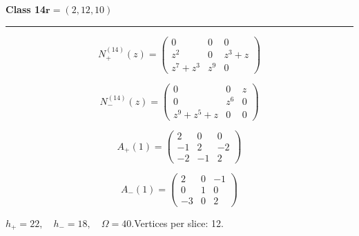 \noindent\begin{minipage}{\linewidth}
\noindent\textbf{Class 14}\hfill $\symbf{r}=(2,12,10)$
\par\smallskip\noindent\textcolor{rulegray}{\rule{\linewidth}{0.3pt}}
\begin{minipage}[c]{0.495\linewidth}\centering\fontsize{10.5}{13}\selectfont
\setlength{\abovedisplayskip}{3pt}\setlength{\belowdisplayskip}{3pt}
\setlength{\abovedisplayshortskip}{3pt}\setlength{\belowdisplayshortskip}{3pt}
\setlength{\arraycolsep}{3.5pt}\renewcommand{\arraystretch}{1.18}
\[N_{+}^{(14)}(z)=\begin{pmatrix}0 & 0 & 0\\z^{2} & 0 & z^{3} + z\\z^{7} + z^{3} & z^{9} & 0\end{pmatrix}\]
\end{minipage}%
\begin{minipage}[c]{0.495\linewidth}\centering\fontsize{10.5}{13}\selectfont
\setlength{\abovedisplayskip}{3pt}\setlength{\belowdisplayskip}{3pt}
\setlength{\abovedisplayshortskip}{3pt}\setlength{\belowdisplayshortskip}{3pt}
\setlength{\arraycolsep}{3.5pt}\renewcommand{\arraystretch}{1.18}
\[N_{-}^{(14)}(z)=\begin{pmatrix}0 & 0 & z\\0 & z^{6} & 0\\z^{9} + z^{5} + z & 0 & 0\end{pmatrix}\]
\end{minipage}%
\par\noindent
\begin{minipage}[c]{0.495\linewidth}\centering\fontsize{10.5}{13}\selectfont
\setlength{\abovedisplayskip}{3pt}\setlength{\belowdisplayskip}{3pt}
\setlength{\abovedisplayshortskip}{3pt}\setlength{\belowdisplayshortskip}{3pt}
\setlength{\arraycolsep}{3.5pt}\renewcommand{\arraystretch}{1.18}
\[A_{+}(1)=\begin{pmatrix}2 & 0 & 0\\-1 & 2 & -2\\-2 & -1 & 2\end{pmatrix}\]
\end{minipage}%
\begin{minipage}[c]{0.495\linewidth}\centering\fontsize{10.5}{13}\selectfont
\setlength{\abovedisplayskip}{3pt}\setlength{\belowdisplayskip}{3pt}
\setlength{\abovedisplayshortskip}{3pt}\setlength{\belowdisplayshortskip}{3pt}
\setlength{\arraycolsep}{3.5pt}\renewcommand{\arraystretch}{1.18}
\[A_{-}(1)=\begin{pmatrix}2 & 0 & -1\\0 & 1 & 0\\-3 & 0 & 2\end{pmatrix}\]
\end{minipage}%
\par\smallskip\noindent\small $h_+=22,\quad h_-=18,\quad \Omega=40.$\quad Vertices per slice: 12.
\end{minipage}\par\vfill
